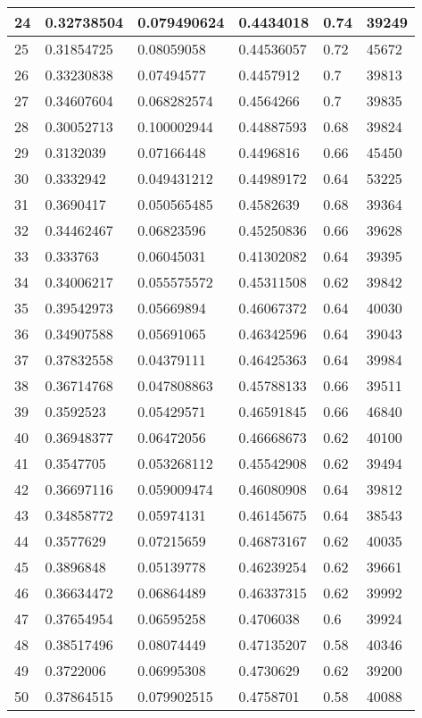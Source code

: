 \begin{longtable}{|l|l|l|l|l|l|}
24 & 0.32738504 & 0.079490624 & 0.4434018 & 0.74 & 39249 \\ \hline 
25 & 0.31854725 & 0.08059058 & 0.44536057 & 0.72 & 45672 \\ \hline 
26 & 0.33230838 & 0.07494577 & 0.4457912 & 0.7 & 39813 \\ \hline 
27 & 0.34607604 & 0.068282574 & 0.4564266 & 0.7 & 39835 \\ \hline 
28 & 0.30052713 & 0.100002944 & 0.44887593 & 0.68 & 39824 \\ \hline 
29 & 0.3132039 & 0.07166448 & 0.4496816 & 0.66 & 45450 \\ \hline 
30 & 0.3332942 & 0.049431212 & 0.44989172 & 0.64 & 53225 \\ \hline 
31 & 0.3690417 & 0.050565485 & 0.4582639 & 0.68 & 39364 \\ \hline 
32 & 0.34462467 & 0.06823596 & 0.45250836 & 0.66 & 39628 \\ \hline 
33 & 0.333763 & 0.06045031 & 0.41302082 & 0.64 & 39395 \\ \hline 
34 & 0.34006217 & 0.055575572 & 0.45311508 & 0.62 & 39842 \\ \hline 
35 & 0.39542973 & 0.05669894 & 0.46067372 & 0.64 & 40030 \\ \hline 
36 & 0.34907588 & 0.05691065 & 0.46342596 & 0.64 & 39043 \\ \hline 
37 & 0.37832558 & 0.04379111 & 0.46425363 & 0.64 & 39984 \\ \hline 
38 & 0.36714768 & 0.047808863 & 0.45788133 & 0.66 & 39511 \\ \hline 
39 & 0.3592523 & 0.05429571 & 0.46591845 & 0.66 & 46840 \\ \hline 
40 & 0.36948377 & 0.06472056 & 0.46668673 & 0.62 & 40100 \\ \hline 
41 & 0.3547705 & 0.053268112 & 0.45542908 & 0.62 & 39494 \\ \hline 
42 & 0.36697116 & 0.059009474 & 0.46080908 & 0.64 & 39812 \\ \hline 
43 & 0.34858772 & 0.05974131 & 0.46145675 & 0.64 & 38543 \\ \hline 
44 & 0.3577629 & 0.07215659 & 0.46873167 & 0.62 & 40035 \\ \hline 
45 & 0.3896848 & 0.05139778 & 0.46239254 & 0.62 & 39661 \\ \hline 
46 & 0.36634472 & 0.06864489 & 0.46337315 & 0.62 & 39992 \\ \hline 
47 & 0.37654954 & 0.06595258 & 0.4706038 & 0.6 & 39924 \\ \hline 
48 & 0.38517496 & 0.08074449 & 0.47135207 & 0.58 & 40346 \\ \hline 
49 & 0.3722006 & 0.06995308 & 0.4730629 & 0.62 & 39200 \\ \hline 
50 & 0.37864515 & 0.079902515 & 0.4758701 & 0.58 & 40088 \\ \hline 
\end{longtable}